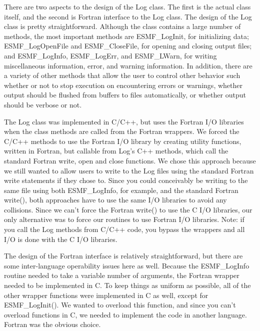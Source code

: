 %


There are two aspects to the design of the Log class.  The first is the actual class
itself, and the second is Fortran interface to the Log class. The design of
the Log class is pretty straightforward. 
Although the class contains a large number of methods, the most important methods
are ESMF\_LogInit, for initializing data; ESMF\_LogOpenFile and ESMF\_CloseFile,
for opening and closing output files; and ESMF\_LogInfo, ESMF\_LogErr, and ESMF\_LWarn, for
writing miscellaneous information, error, and warning information. In addition, there are
a variety of other methods that allow the user to control other behavior such whether
or not to stop execution on encountering errors or warnings, whether output
should be flushed from buffers to files automatically, or whether output should be verbose
or not.

The Log class was implemented in C/C++, but uses the Fortran I/O libraries when
the class methods are called from the Fortran wrappers. We forced the C/C++ methods 
to use the Fortran I/O library by creating 
utility functions, written in Fortran, but callable from Log's C++ methods,
which call the standard Fortran write, open and close functions.  We chose this 
approach because we still wanted to allow users to write to the Log files using the
standard Fortran write statements if they chose to.
Since you could conceivably be writing to the same file using 
both ESMF\_LogInfo, for example,  and the standard Fortran  write(),
both approaches have to use the same I/O 
libraries to avoid any collisions.  Since we can't force the Fortran write() to use the
C I/O libraries, our only alternative was to force our routines to use Fortran I/O
libraries.  Note: if you call the Log methods from C/C++ code, you bypass the wrappers
and all I/O is done with the C I/O libraries.

The design of the Fortran interface is relatively straightforward, but there are some
inter-language operability issues here as well.
Because the ESMF\_LogInfo routine needed to
take a variable number of arguments, the Fortran wrapper needed to be implemented in C.
To keep things as uniform as possible, all of the other wrapper functions were implemented
in C as well, except for ESMF\_LogInit(). We wanted to overload this function, and since
you can't overload functions in C, we needed to implement the code in another language.
Fortran was the obvious choice.




